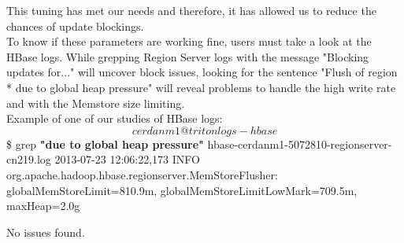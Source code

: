 \begin{enumerate}
This tuning has met our needs and therefore, it has allowed us to reduce the chances of update blockings.
\\
To know if these parameters are working fine, users must take a look at the HBase logs. While grepping Region Server logs with the message "Blocking updates for..." will uncover block issues, looking for the sentence "Flush of region * due to global heap pressure" will reveal problems to handle the high write rate and with the Memstore size limiting. 
\\
Example of one of our studies of HBase logs:
\[cerdanm1@triton logs-hbase\]\$ grep \textbf{"due to global heap pressure"} hbase-cerdanm1-5072810-regionserver-cn219.log 
2013-07-23 12:06:22,173 INFO org.apache.hadoop.hbase.regionserver.MemStoreFlusher: globalMemStoreLimit=810.9m, globalMemStoreLimitLowMark=709.5m, maxHeap=2.0g

No issues found.


\end{enumerate}


